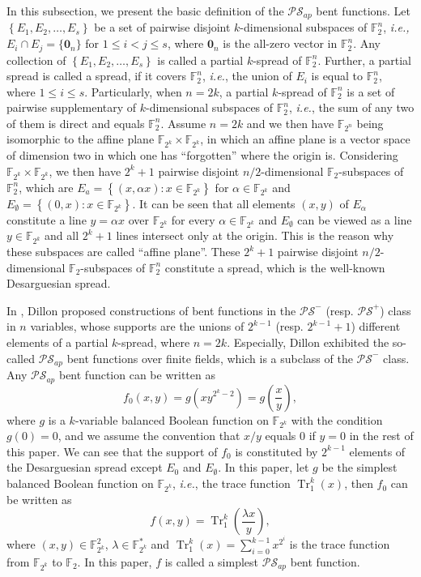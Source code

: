 \documentclass[preprint,10pt]{elsarticle}
\newcommand{\F}{\mathbb{F}}
\newcommand{\0}{\textbf{0}}
\newcommand{\1}{\textbf{1}}
\newcommand{\TRACE}{\operatorname{Tr}_1^k}
\theoremstyle{plain}
\begin{document}
In this subsection, we present the basic definition of the $\mathcal{PS}_{ap}$ bent functions.
Let $\left\{ E_1,E_2,\dots,E_s \right\}$ be a set of pairwise disjoint $k$-dimensional subspaces of $\F_2^n$, {\em i.e.,}
$E_i\cap E_j = \{\bm{0}_n\}$ for $1\le i<j\le s$, where $\bm{0}_n$ is the all-zero vector in $\F_2^n$.
Any collection of $\left\{ E_1,E_2,\dots,E_s \right\}$ is called a partial $k$-spread of $\F_2^n$.
Further, a partial spread is called a spread, if it covers $\F_2^n$, \emph{i.e.}, the union of $E_i$ is equal to $\F_2^n$, where $1\le i\le s$.
Particularly, when $n=2k$, a partial $k$-spread of $\F_2^n$ is a set of pairwise supplementary of $k$-dimensional subspaces of $\F_2^n$,
\emph{i.e.},  the sum of any two of them is direct and equals $\F_2^n$.
Assume $n=2k$ and we then have $\F_{2^n}$ being isomorphic to the affine plane $\F_{2^k}\times\F_{2^k}$,
in which  an affine plane is a vector space of dimension two in which one has ``forgotten'' where the origin is.
Considering $\F_{2^k}\times\F_{2^k}$, we then have $2^k+1$ pairwise disjoint $n/2$-dimensional $\F_2$-subspaces of $\F_2^n$, which are
$E_a=\left\{(x,\alpha x) : x\in\F_{2^k}\right\}$ for $\alpha\in\F_{2^k}$ and $E_{\emptyset}=\left\{(0,x) : x\in\F_{2^k}\right\}$.
It can be seen that all elements $(x,y)$ of $E_{\alpha}$ constitute a line $y=\alpha x$ over $\F_{2^k}$ for every $\alpha\in\F_{2^k}$ and
$E_{\emptyset}$ can be viewed as a line $y\in\F_{2^k}$ and all $2^k+1$ lines intersect only at the origin.
This is the reason why these subspaces are called ``affine plane''.
These $2^k+1$ pairwise disjoint $n/2$-dimensional $\F_2$-subspaces of $\F_2^n$ constitute a spread, which is the well-known Desarguesian spread.

In \cite{Dillon1974PSbent}, Dillon proposed constructions of bent functions in the $\mathcal{PS}^-$ (resp. $\mathcal{PS}^+$) class in $n$ variables, whose supports are the unions of $2^{k-1}$ (resp. $2^{k-1}+1$) different elements of a partial $k$-spread, where $n=2k$.
Especially, Dillon exhibited the so-called $\mathcal{PS}_{ap}$ bent functions over finite fields, which is a subclass of the $\mathcal{PS}^-$ class.
Any $\mathcal{PS}_{ap}$ bent function can be written as
\begin{equation*}\label{Eqn_PS_bent}
    f_0(x,y)=g\left(xy^{2^k-2}\right)=g\left(\frac{x}{y}\right),
\end{equation*}
where $g$ is a $k$-variable balanced Boolean function on $\F_{2^{k}}$ with the condition $g(0)=0$, and we assume the convention that $x/y$ equals $0$ if $y=0$ in the rest of this paper.
We can see that the support of $f_0$ is constituted by $2^{k-1}$ elements of the Desarguesian spread except $E_0$ and $E_{\emptyset}$.
In this paper, let $g$ be the simplest balanced Boolean function on $\F_{2^k}$, \emph{i.e.}, the trace function $\TRACE(x)$, then
$f_0$ can be written as
\begin{equation*}\label{sub-bent}
    f(x,y)=\TRACE\left(\frac{\lambda x}{y}\right),
\end{equation*}
where $(x,y)\in\F_{2^k}^2$, $\lambda\in\F_{2^k}^{*}$ and $\TRACE(x)=\sum\limits_{i=0}^{k-1}x^{2^i}$ is the trace function from $\F_{2^k}$ to $\F_2$.
In this paper, $f$ is called a simplest $\mathcal{PS}_{ap}$ bent function.
\end{document}
